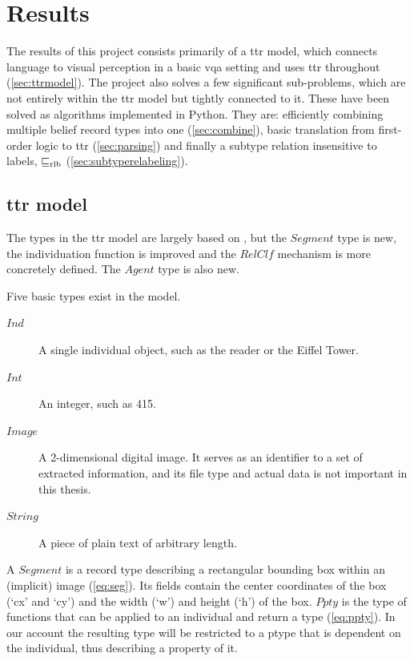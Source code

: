 \renewcommand{\sectionautorefname}{Section}
\let\subsectionautorefname\sectionautorefname
\let\subsubsectionautorefname\sectionautorefname
\section{Results}
\label{sec:results}

The results of this project consists primarily of a \gls{ttr} model, which connects language to visual perception in a basic \gls{vqa} setting and uses \gls{ttr} throughout (\autoref{sec:ttrmodel}).
The project also solves a few significant sub-problems, which are not entirely within the \gls{ttr} model but tightly connected to it.
These have been solved as algorithms implemented in Python.
They are: efficiently combining multiple belief record types into one (\autoref{sec:combine}), basic translation from first-order logic to \gls{ttr} (\autoref{sec:parsing}) and finally a subtype relation insensitive to labels, $\mathrel{\sqsubseteq_\text{rlb}}$ (\autoref{sec:subtyperelabeling}).



\subsection{\Gls{ttr} model}
\label{sec:ttrmodel}

The types in the \gls{ttr} model are largely based on \cite{lspc}, but the $Segment$ type is new, the individuation function is improved and the $RelClf$ mechanism is more concretely defined.
The $Agent$ type is also new.

Five basic types exist in the model.

\begin{description}
\item [$Ind$] A single individual object, such as the reader or the Eiffel Tower.
\item [$Int$] An integer, such as 415.
\item [$Image$] A 2-dimensional digital image. It serves as an identifier to a set of extracted information, and its file type and actual data is not important in this thesis.
\item [$String$] A piece of plain text of arbitrary length.
\end{description}

A $Segment$ is a record type describing a rectangular bounding box within an (implicit) image (\autoref{eq:seg}).
Its fields contain the center coordinates of the box (`cx' and `cy') and the width (`w') and height (`h') of the box.
$Ppty$ is the type of functions that can be applied to an individual and return a type (\autoref{eq:ppty}).
In our account the resulting type will be restricted to a ptype that is dependent on the individual, thus describing a property of it.

